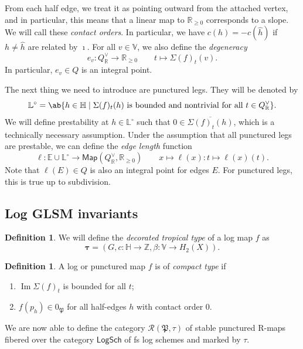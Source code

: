 \documentclass{amsart}
\theoremstyle{definition}
\newtheorem{defn}[thm]{Definition}
\theoremstyle{remark}
\theoremstyle{plain}
\theoremstyle{definition}
\theoremstyle{remark}
\DeclareMathOperator{\Ima}{Im}
\newcommand{\R}{\mathbb{R}}
\newcommand{\Z}{\mathbb{Z}}
\newcommand{\E}{\mathbb{E}}
\newcommand{\V}{\mathbb{V}}
\renewcommand{\H}{\mathbb{H}}
\renewcommand{\L}{\mathbb{L}}
\newcommand{\mc}[1]{\mathcal{#1}}
\newcommand{\mf}[1]{\mathfrak{#1}}
\newcommand{\ms}[1]{\mathsf{#1}}
\newcommand{\ol}[1]{\overline{#1}}
\newcommand{\1}{\mathbf{1}}
\newcommand{\2}{\mathbf{2}}
\newcommand{\3}{\mathbf{3}}
\begin{document}
From each half edge, we treat it as pointing outward from the attached vertex, and in particular, this means that a linear map to \(\R_{\geq 0}\) corresponds to a slope. We will call these \textit{contact orders}. In particular, we have \(c(h) = - c(\hat{h})\) if \(h \neq \hat{h}\) are related by \(\imath\). For all \(v \in \V\), we also define the \textit{degeneracy}
\[ e_v \colon Q_{\R}^{\vee} \to \R_{\geq 0} \qquad t \mapsto \Sigma(f)_t (v). \]
In particular, \(e_v \in Q\) is an integral point.

The next thing we need to introduce are punctured legs. They will be denoted by
\[ \L^{\circ} = \ab\{ h \in \H \mid \Sigma(f)_t(h) \text{ is bounded and nontrivial for all } t \in Q_{\R}^{\vee}\}. \] 
We will define prestability at \(h \in \L^{\circ}\) such that \(0 \in \ol{\Sigma(f)_t(h)}\), which is a technically necessary assumption. Under the assumption that all punctured legs are prestable, we can define the \textit{edge length} function
\[ \ell \colon \E \cup \L^{\circ} \to \ms{Map}(Q_{\R}^{\vee}, \R_{\geq 0}) \qquad x \mapsto \ell(x) \colon t \mapsto \ell(x)(t). \]
Note that \(\ell(E) \in Q\) is also an integral point for edges \(E\). For punctured legs, this is true up to subdivision.

\subsection{Log GLSM invariants}%
\label{sub:Log GLSM invariants}

\begin{defn}
    We will define the \textit{decorated tropical type} of a log map \(f\) as
    \[ \bm{\tau} = (G, c \colon \H \to \Z, \beta \colon \V \to H_2(X)). \]
\end{defn}

\begin{defn}
    A log or punctured map \(f\) is of \textit{compact type} if
    \begin{enumerate}
        \item \(\Ima \Sigma(f)_t\) is bounded for all \(t\);
        \item \(f(p_h) \in 0_{\mf{P}}\) for all half-edges \(h\) with contact order \(0\).
    \end{enumerate}
\end{defn}

We are now able to define the category \(\mc{R}(\mf{P}, \tau)\) of stable punctured R-maps fibered over the category \(\ms{LogSch}\) of fs log schemes and marked by \(\tau\).
\end{document}
